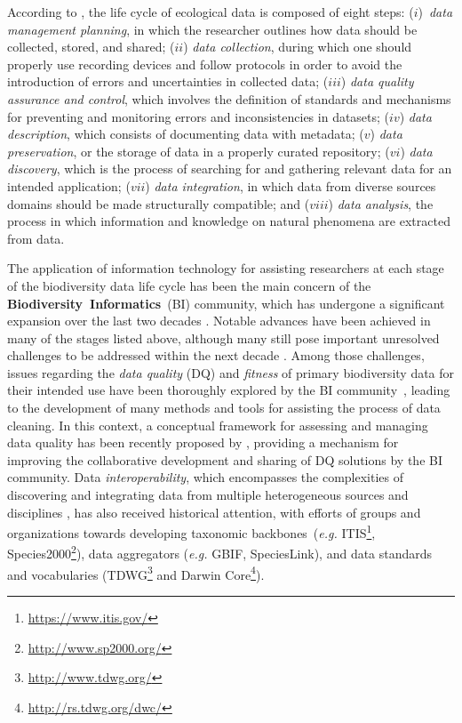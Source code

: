 According to , the life cycle of ecological data is composed of eight steps: 
($i$)~\textit{data management planning}, in which the researcher outlines how data should be collected, stored, and shared;
($ii$) \textit{data collection}, during which one should properly use recording devices and follow protocols in order to avoid the introduction of errors and uncertainties in collected data;
($iii$) \textit{data quality assurance and control}, which involves the definition of standards and mechanisms for preventing and monitoring errors and inconsistencies in datasets;
($iv$) \textit{data description}, which consists of documenting data with metadata;
($v$) \textit{data preservation}, or the storage of data in a properly curated repository;
($vi$) \textit{data discovery}, which is the process of searching for and gathering relevant data for an intended application;
($vii$) \textit{data integration}, in which data from diverse sources domains should be made structurally compatible; and
($viii$) \textit{data analysis}, the process in which information and knowledge on natural phenomena are extracted from data.

The application of information technology for assisting researchers at each stage of the biodiversity data life cycle has been the main concern of the \textbf{Biodiversity~Informatics}~(BI) community, which has undergone a significant expansion over the last two decades \cite{Soberon2004}.
Notable advances have been achieved in many of the stages listed above, although many still pose important unresolved challenges to be addressed within the next decade \cite{Peterson2015}.
%
Among those challenges, issues regarding the \textit{data quality} (DQ) and \textit{fitness} of primary biodiversity data for their intended use have been thoroughly explored by the BI community~\cite{Chapman2005a}, leading to the development of many methods and tools for assisting the process of data cleaning. 
In this context, a conceptual framework for assessing and managing data quality has been recently proposed by , providing a mechanism for improving the collaborative development and sharing of DQ solutions by the BI community.
%
Data \textit{interoperability}, which encompasses the complexities of discovering and integrating data from multiple heterogeneous sources and disciplines \cite{Bisby2000}, has also received historical attention, with efforts of groups and organizations towards developing taxonomic backbones~(\textit{e.g.} ITIS\footnote{\url{https://www.itis.gov/}}, Species2000\footnote{\url{http://www.sp2000.org/}}), 
data aggregators (\textit{e.g.} GBIF, SpeciesLink), and 
data standards and vocabularies (TDWG\footnote{\url{http://www.tdwg.org/}} and Darwin Core\footnote{\url{http://rs.tdwg.org/dwc/}}).

